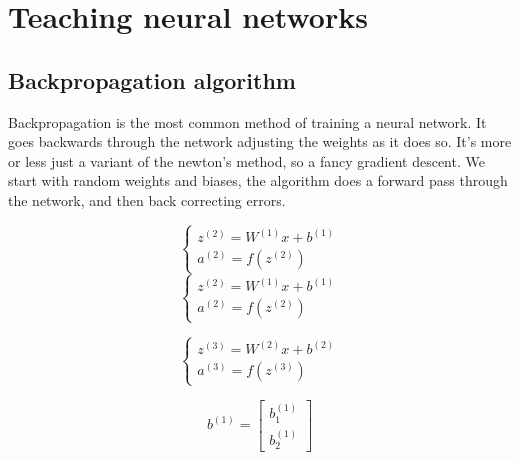 
\chapter{Teaching neural networks}
\section{Backpropagation algorithm}
{
    Backpropagation is the most common method of training a neural network. It goes backwards through the network adjusting the weights as it does so.
    It's more or less just a variant of the newton's method, so a fancy gradient descent.
    We start with random weights and biases, the algorithm does a forward pass through the network, and then back correcting errors.

    \begin{neuralnetwork}
        
        \hiddenlayer[count = 2, bias = false, title=Hidden\\layer 2, text = a] \linklayers

    \end{neuralnetwork}

    \ex{}
    {

        \begin{equation}
            \begin{cases}
            z^{(2)} = W^{(1)}x + b^{(1)}\\
            a^{(2)} = f(z^{(2)})
            \end{cases}
        \end{equation}
        \begin{equation}
            \begin{cases}
            z^{(2)} = W^{(1)}x + b^{(1)}\\
            a^{(2)} = f(z^{(2)})
            \end{cases}
        \end{equation}

        \begin{equation}
            \begin{cases}
            z^{(3)} = W^{(2)}x + b^{(2)}\\
            a^{(3)} = f(z^{(3)})
            \end{cases}
        \end{equation}

        \begin{equation}
            b^{(1)} = \begin{bmatrix}
                b_1^{(1)}   \\
                b_2^{(1)}
            \end{bmatrix}

        \end{equation}
                
    }
}


